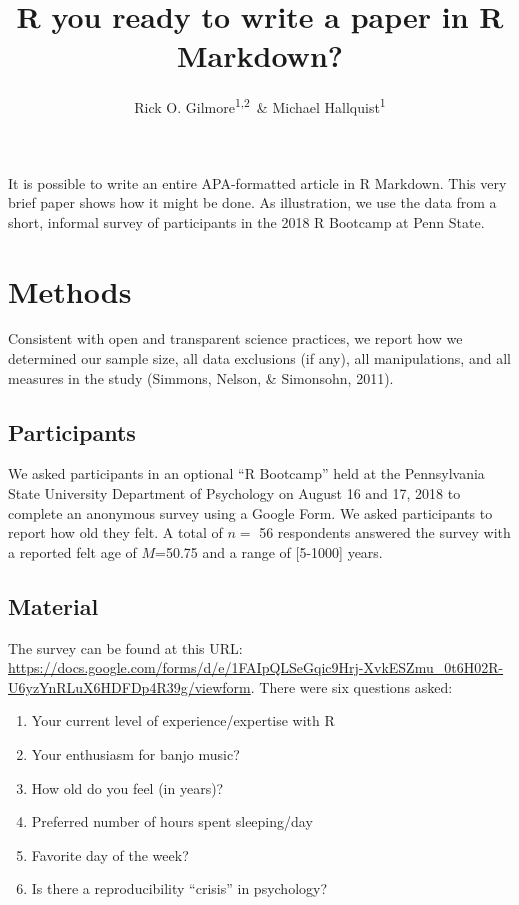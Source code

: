 \documentclass[english,man]{apa6}
\title{R you ready to write a paper in R Markdown?}
\author{Rick O. Gilmore\textsuperscript{1,2}~\& Michael Hallquist\textsuperscript{1}}
\affiliation{
    \vspace{0.5cm}
          \textsuperscript{1} The Pennsylvania State University\\
          \textsuperscript{2} Databrary.org  }
\providecommand{\tightlist}{%
  \setlength{\itemsep}{0pt}\setlength{\parskip}{0pt}}
\theoremstyle{definition}
\theoremstyle{definition}
\theoremstyle{definition}
\theoremstyle{remark}
\begin{document}
\maketitle

\setcounter{secnumdepth}{0}



It is possible to write an entire APA-formatted article in R Markdown.
This very brief paper shows how it might be done. As illustration, we
use the data from a short, informal survey of participants in the 2018 R
Bootcamp at Penn State.

\section{Methods}\label{methods}

Consistent with open and transparent science practices, we report how we
determined our sample size, all data exclusions (if any), all
manipulations, and all measures in the study (Simmons, Nelson, \&
Simonsohn, 2011).

\subsection{Participants}\label{participants}

We asked participants in an optional \enquote{R Bootcamp} held at the
Pennsylvania State University Department of Psychology on August 16 and
17, 2018 to complete an anonymous survey using a Google Form. We asked
participants to report how old they felt. A total of \(n=\) 56
respondents answered the survey with a reported felt age of \(M\)=50.75
and a range of {[}5-1000{]} years.

\subsection{Material}\label{material}

The survey can be found at this URL:
\url{https://docs.google.com/forms/d/e/1FAIpQLSeGqic9Hrj-XvkESZmu_0t6H02R-U6yzYnRLuX6HDFDp4R39g/viewform}.
There were six questions asked:

\begin{enumerate}
\def\labelenumi{\arabic{enumi}.}
\tightlist
\item
  Your current level of experience/expertise with R
\item
  Your enthusiasm for banjo music?
\item
  How old do you feel (in years)?
\item
  Preferred number of hours spent sleeping/day
\item
  Favorite day of the week?
\item
  Is there a reproducibility \enquote{crisis} in psychology?
\end{enumerate}
\end{document}
